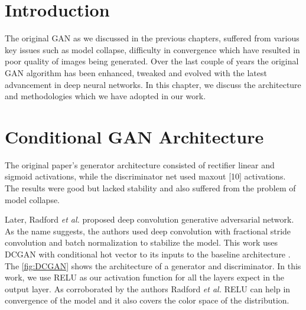 
\section{Introduction}
The original GAN as we discussed in the previous chapters, suffered from various key issues such as model collapse, difficulty in convergence which have resulted in poor quality of images being generated. Over the last couple of years the original GAN algorithm has been enhanced, tweaked and evolved  with the latest advancement in deep neural networks. In this chapter, we discuss the architecture and methodologies which we have adopted in our work.  


\section{Conditional GAN Architecture} 
The original paper's\cite{Original-GAN} generator architecture consisted of rectifier linear\cite{RELU} and sigmoid activations, while the discriminator net used maxout [10] activations. The results were good but lacked stability and also suffered from the problem of model collapse.
\par
Later, Radford \textit{et al.}\cite{DCGAN} proposed deep convolution generative adversarial network. As the name suggests, the authors used deep convolution with fractional stride convolution and batch normalization to stabilize the model. This work uses DCGAN with conditional hot vector to its inputs to the baseline architecture . The \cref{fig:DCGAN} shows the architecture of a generator and discriminator. In this work, we use RELU as our activation function for all the layers expect in the output layer. As corroborated by the authors Radford \textit{et al.}\cite{DCGAN} RELU can help in convergence of the model and it also covers the color space of the distribution.
